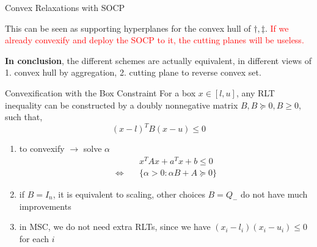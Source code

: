 \documentclass[aspectratio=1610, 10pt]{beamer}
\newcommand{\red}[1]{\textcolor{red}{#1}}
\begin{document}
\begin{frame}[allowframebreaks]{Convex Relaxations with SOCP}
\begin{enumerate}
          This can be seen as supporting hyperplanes for the convex hull of \(\dagger, \ddagger\). \red{If we already convexify and deploy the SOCP to it, the cutting planes will be useless.}
  \end{enumerate}

  \textbf{In conclusion}, the different schemes are actually equivalent, in different views of 1. convex hull by aggregation, 2. cutting plane to reverse convex set.
  \framebreak

\end{frame}

\begin{frame}[allowframebreaks]{Convexification with the Box Constraint}
  For a box \(x \in [l, u]\), any RLT inequality can be constructed by a doubly nonnegative matrix \(B, B \succeq 0, B \ge 0\), such that,
  \begin{equation*}
    (x-l)^TB(x-u) \le 0
  \end{equation*}
  \begin{enumerate}
    \item to convexify \(\rightarrow\) solve \(\alpha\)
          \begin{align*}
                                  & x^TAx + a^Tx + b\le 0                 \\
            \Leftrightarrow \quad & \{\alpha >0: \alpha B + A \succeq 0\}
          \end{align*}
    \item if \(B= I_n\), it is equivalent to scaling, other choices \(B= Q_-\) do not have much improvements
    \item in MSC, we do not need extra RLTs, since we have \((x_i - l_i)(x_i - u_i) \le 0\) for each \(i\)
  \end{enumerate}
\end{frame}
\end{document}
